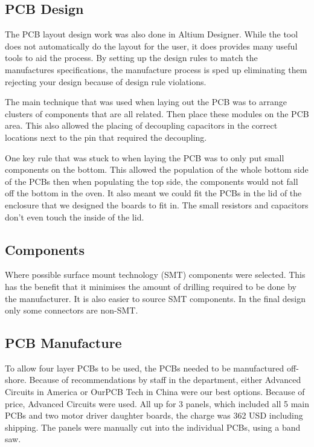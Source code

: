   \subsection{PCB Design}
  The PCB layout design work was also done in Altium Designer. While the tool
  does not automatically do the layout for the user, it does provides many
  useful tools to aid the process. By setting up the design rules to match the
  manufactures specifications, the manufacture process is sped up eliminating
  them rejecting your design because of design rule violations.

  The main technique that was used when laying out the PCB was to arrange
  clusters of components that are all related. Then place these modules on the
  PCB area. This also allowed the placing of decoupling capacitors in the
  correct locations next to the pin that required the decoupling.
  
  One key rule that was stuck to when laying the PCB was to only put small
  components on the bottom. This allowed the population of the whole bottom side
  of the PCBs then when populating the top side, the components would not fall
  off the bottom in the oven. It also meant we could fit the PCBs in the lid of
  the enclosure that we designed the boards to fit in. The small resistors and
  capacitors don't even touch the inside of the lid.

  \subsection{Components}
  Where possible surface mount technology (SMT) components were selected. This
  has the benefit that it minimises the amount of drilling required to be done
  by the manufacturer. It is also easier to source SMT components. In the final
  design only some connectors are non-SMT.

  \subsection{PCB Manufacture}
  To allow four layer PCBs to be used, the PCBs needed to be manufactured
  off-shore. Because of recommendations by staff in the department, either
  Advanced Circuits in America\cite{advancedCircuits} or OurPCB Tech in
  China\cite{ourPCB} were our best options.  Because of price, Advanced Circuits
  were used. All up for 3 panels, which included all 5 main PCBs and two motor
  driver daughter boards, the charge was 362 USD including shipping. The panels
  were manually cut into the individual PCBs, using a band saw.
  
